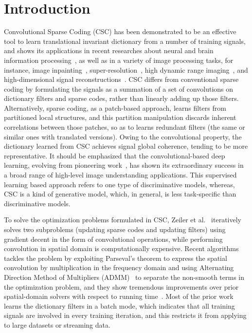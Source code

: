\section{Introduction}
Convolutional Sparse Coding (CSC) has been demonstrated to be an effective tool to learn translational invariant dictionary from a number of training signals, and shows its applications in recent researches about neural and brain information processing~\cite{jas2017learning,peter2017sparse}, as well as in a variety of image processing tasks, for instance, image inpainting~\cite{heide2015fast}, super-resolution~\cite{gu2015convolutional}, high dynamic range imaging~\cite{serrano2016convolutional}, and high-dimensional signal reconstructions~\cite{choudhury2017consensus,bibi2017high}. CSC differs from conventional sparse coding by formulating the signals as a summation of a set of convolutions on dictionary filters and sparse codes, rather than linearly adding up those filters. Alternatively, sparse coding, as a patch-based approach, learns filters from partitioned local structures, and this partition manipulation discards inherent correlations between those patches, so as to learns redundant filters (the same or similar ones with translated versions). Owing to the convolutional property, the dictionary learned from CSC achieves signal global coherence, tending to be more representative. It should be emphasized that the convolutional-based deep learning, evolving from pioneering work~\cite{lecun1998gradient,kavukcuoglu2010learning,krizhevsky2012imagenet}, has shown its extraordinary success in a broad range of high-level image understanding applications. This supervised learning based approach refers to one type of discriminative models, whereas, CSC is a kind of generative model, which, in general, is less task-specific than discriminative models.

To solve the optimization problems formulated in CSC, Zeiler et al.~\cite{zeiler2010deconvolutional} iteratively solves two subproblems (updating sparse codes and updating filters) using gradient decent in the form of convolutional operations, while performing convolution in spatial domain is computationally expensive. Recent algorithms tackles the problem by exploiting Parseval's theorem to express the spatial convolution by multiplication in the frequency domain and using Alternating Direction Method of Multipliers (ADMM)~\cite{boyd2011distributed} to separate the non-smooth terms in the optimization problem, and they show tremendous improvements over prior spatial-domain solvers with respect to running time~\cite{bristow2013fast,heide2015fast,wohlberg2016efficient}. Most of the prior work learns the dictionary filters in a batch mode, which indicates that all training signals are involved in every training iteration, and this restricts it from applying to large datasets or streaming data. 

